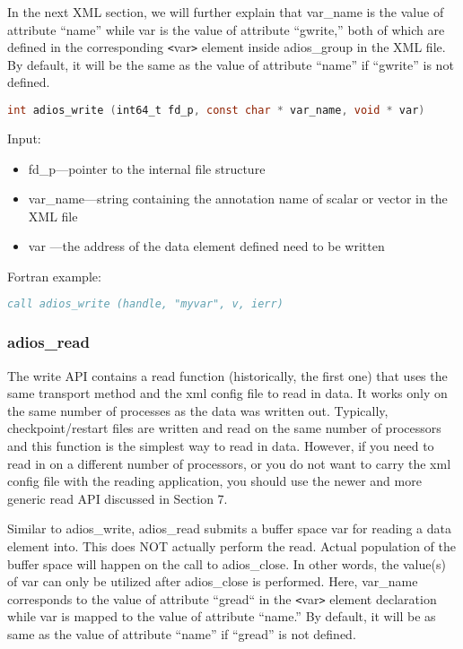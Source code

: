 In the next XML section, we will further explain that var\_name is the value of 
attribute ``name'' while var is the value of attribute ``gwrite,'' both of which 
are defined in the corresponding \texttt{<}var\texttt{>} element inside adios\_group 
in the XML file. By default, it will be the same as the value of attribute ``name'' 
if ``gwrite'' is not defined. 

\begin{lstlisting}[language=C,caption={},label={}]
int adios_write (int64_t fd_p, const char * var_name, void * var)
\end{lstlisting}

Input:
\begin{itemize}
\item fd\_p---pointer to the internal file structure
\item var\_name---string containing the annotation name of scalar or vector in the XML file
\item var ---the address of the data element defined need to be written
\end{itemize}

Fortran example: 
\begin{lstlisting}[language=Fortran,caption={},label={}]
call adios_write (handle, "myvar", v, ierr)
\end{lstlisting}

\subsubsection{adios\_read}

The write API contains a read function (historically, the first one) that uses 
the same transport method and the xml config file to read in data. It works only 
on the same number of processes as the data was written out. Typically, checkpoint/restart 
files are written and read on the same number of processors and this function is 
the simplest way to read in data. However, if you need to read in on a different 
number of processors, or you do not want to carry the xml config file with the 
reading application, you should use the newer and more generic read API discussed 
in Section 7.

Similar to adios\_write, {\color{color01} adios\_read submits a buffer space var 
for reading a data element into. This does NOT actually perform the read. Actual 
population of the buffer space will happen on the call to adios\_close. In other 
words, the value(s) of var can only be utilized after adios\_close is performed. 
Here, }var\_name corresponds to the value of attribute ``gread`` in the \texttt{<}var\texttt{>} 
element declaration while var is mapped to the value of attribute ``name.'' By 
default, it will be as same as the value of attribute ``name'' if ``gread'' is 
not defined.

